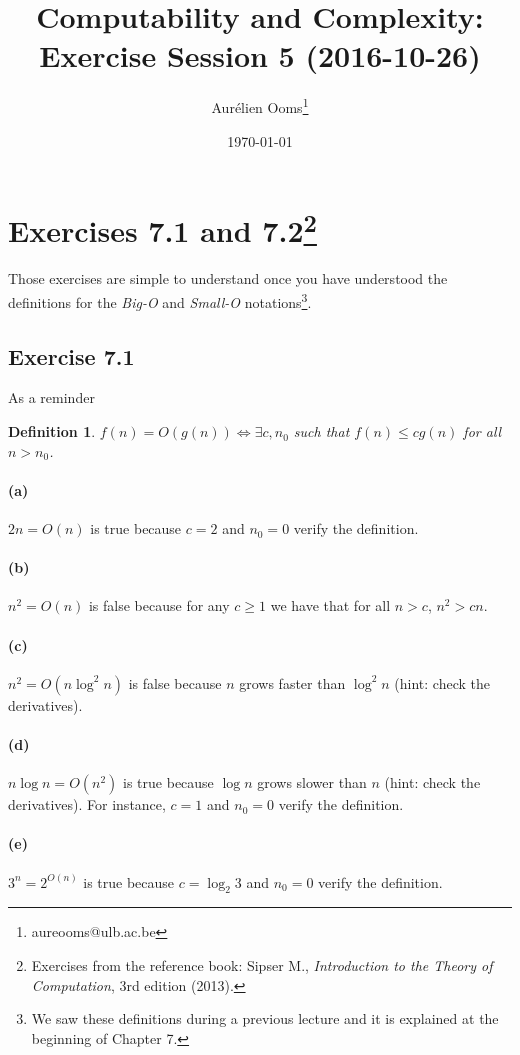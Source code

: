 \documentclass{article}
\title{Computability and Complexity:\\Exercise Session 5 (2016-10-26)}
\author{Aurélien Ooms\footnote{aureooms@ulb.ac.be}}
\date{\today}
\newcommand{\definitionname}{Definition}
\newtheorem{definition}{\definitionname}
\begin{document}
\maketitle
\tableofcontents

\section{Exercises 7.1 and 7.2\footnote{Exercises from the reference book: Sipser M.,
\emph{Introduction to the Theory of Computation}, 3rd edition (2013).}}
Those exercises are simple to understand once you have understood the definitions for the
\emph{Big-O} and \emph{Small-O} notations\footnote{We saw these definitions
during a previous lecture and it is explained at the beginning of Chapter 7.}.

\subsection{Exercise 7.1}
As a reminder
\begin{definition}
	\(f(n) = O(g(n)) \iff \exists c, n_0\) such that \(f(n) \le c g(n)\) for
	all \(n > n_0\).
\end{definition}

\paragraph{(a)}
\(2n = O(n)\)
is true because \(c = 2\) and \(n_0 = 0\) verify the definition.

\paragraph{(b)}
\(n^2 = O(n)\)
is false because for any \(c \ge 1\) we have that for all \(n > c\), \(n^2 > cn\).

\paragraph{(c)}
\(n^2 = O(n \log^2 n)\)
is false because $n$ grows faster than $\log^2 n$ (hint: check the derivatives).

\paragraph{(d)}
\(n \log n = O(n^2)\)
is true because $\log n$ grows slower than $n$ (hint: check the derivatives).
For instance, \(c = 1\) and \(n_0 = 0\) verify the definition.

\paragraph{(e)}
\(3^n = 2^{O(n)}\)
is true because \(c = \log_2 3\) and \(n_0 = 0\) verify the definition.
\end{document}
